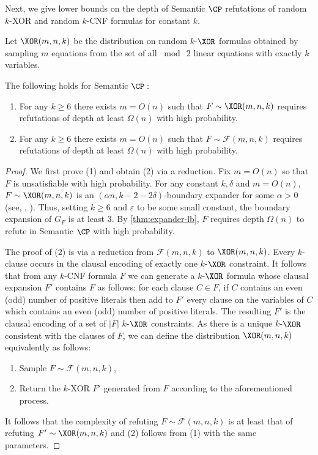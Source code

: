 \documentclass{toc}
\begin{document}
Next, we give lower bounds on the depth of Semantic $\CP$ refutations of random $k$-XOR and random $k$-CNF formulas for constant $k$.
\begin{definition}
	Let $\XOR(m,n,k)$ be the distribution on random $k$-$\XOR$ formulas obtained by sampling $m$ equations from the set of all $\bmod\ 2$ linear equations with exactly $k$ variables.
\end{definition}
\begin{theorem}\label{thm:randomLB}
The following holds for Semantic $\CP:$
	\begin{enumerate}
		\item[$1$.] For any $k \geq 6$ there exists $m = O(n)$ such that $F \sim \XOR(m,n,k)$ requires refutations of depth at least $\Omega(n)$ with high probability.
		\item[$2$.] For any $k \geq 6$ there exists $m = O(n)$ such that $F \sim \mathcal{F}(m,n,k)$ requires refutations of depth at least $\Omega(n)$ with high probability.
	\end{enumerate}
\end{theorem}
%
\begin{proof}
	We first prove (1) and obtain (2) via a reduction. 
	Fix $m= O(n)$ so that $F$ is unsatisfiable with high probability. 
	For any constant $k,\delta$ and $m=O(n)$,  $F \sim \XOR(m,n,k)$ is an $(\alpha n, k-2-2\delta)$-boundary expander for some $\alpha > 0$ (see, \eg, \cite{BGHMP06,cs-resolution}). 
	Thus, setting $k \geq 6$ and $\varepsilon$ to be some small constant, the boundary expansion of $G_F$ is at least $3$. 
	By \autoref{thm:expander-lb}, $F$ requires depth $\Omega(n)$ to refute in Semantic $\CP$ with high probability.
	
	The proof of (2) is via a reduction from $\mathcal{F}(m,n,k)$ to $\XOR(m,n,k)$. 
	Every $k$-clause occurs in the clausal encoding of exactly one $k$-$\XOR$ constraint. 
	It follows that from any $k$-CNF formula $F$ we can generate a $k$-$\XOR$ formula whose clausal expansion $F'$ contains $F$ as follows:
	for each clause $C \in F$, if $C$ contains an even (odd) number of positive literals then add to $F'$ every clause on the variables of $C$ which contains an even (odd) number of positive literals. The resulting $F'$ is the clausal encoding of a set of $|F|$ $k$-$\XOR$ constraints. As there is a unique $k$-$\XOR$ consistent with the clauses of $F$, we can define the distribution $\XOR(m,n,k)$ equivalently as follows: 
	\begin{enumerate}
		\item Sample $F \sim \mathcal{F}(m,n,k)$,
		\item Return the $k$-XOR $F'$ generated from $F$ according to the aforementioned process.
	\end{enumerate}
	It follows that the complexity of refuting $F \sim \mathcal{F}(m,n,k)$ is at least that of refuting $F' \sim \XOR(m,n,k)$ and (2) follows from (1) with the same parameters. 
\end{proof}
\end{document}
